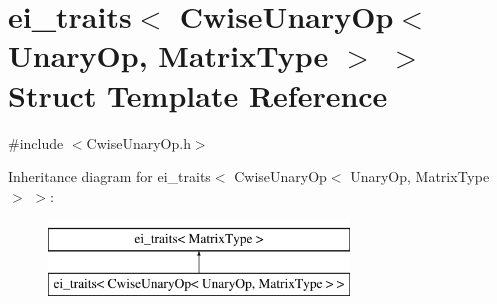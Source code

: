 \hypertarget{structei__traits_3_01_cwise_unary_op_3_01_unary_op_00_01_matrix_type_01_4_01_4}{\section{ei\-\_\-traits$<$ Cwise\-Unary\-Op$<$ Unary\-Op, Matrix\-Type $>$ $>$ Struct Template Reference}
\label{structei__traits_3_01_cwise_unary_op_3_01_unary_op_00_01_matrix_type_01_4_01_4}
}


{\ttfamily \#include $<$Cwise\-Unary\-Op.\-h$>$}

Inheritance diagram for ei\-\_\-traits$<$ Cwise\-Unary\-Op$<$ Unary\-Op, Matrix\-Type $>$ $>$\-:\begin{figure}[H]
\begin{center}
\leavevmode
\includegraphics[height=2.000000cm]{structei__traits_3_01_cwise_unary_op_3_01_unary_op_00_01_matrix_type_01_4_01_4}
\end{center}
\end{figure}
